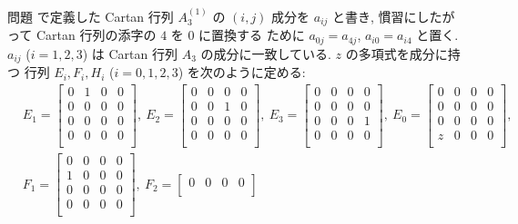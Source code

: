 \documentclass[12pt,twoside]{jarticle}
\begin{document}
\begin{question}
  問題  で定義した
  Cartan 行列 $A_3^{(1)}$ の $(i,j)$ 成分を $a_{ij}$ と書き,
  慣習にしたがって Cartan 行列の添字の $4$ を $0$ に置換する
  ために $a_{0j}=a_{4j}$, $a_{i0}=a_{i4}$ と置く.
  $a_{ij}$ ($i=1,2,3$) は Cartan 行列 $A_3$ の成分に一致している.
  $z$ の多項式を成分に持つ
  行列 $E_i,F_i,H_i$ ($i=0,1,2,3$) を次のように定める:
  {\small
  \begin{align*}
    &
    E_1 = 
    \begin{bmatrix}
      0 & 1 & 0 & 0 \\
      0 & 0 & 0 & 0 \\
      0 & 0 & 0 & 0 \\
      0 & 0 & 0 & 0 \\
    \end{bmatrix},
    \ %
    E_2 = 
    \begin{bmatrix}
      0 & 0 & 0 & 0 \\
      0 & 0 & 1 & 0 \\
      0 & 0 & 0 & 0 \\
      0 & 0 & 0 & 0 \\
    \end{bmatrix},
    \ %
    E_3 = 
    \begin{bmatrix}
      0 & 0 & 0 & 0 \\
      0 & 0 & 0 & 0 \\
      0 & 0 & 0 & 1 \\
      0 & 0 & 0 & 0 \\
    \end{bmatrix},
    \ %
    E_0 = 
    \begin{bmatrix}
      0 & 0 & 0 & 0 \\
      0 & 0 & 0 & 0 \\
      0 & 0 & 0 & 0 \\
      z & 0 & 0 & 0 \\
    \end{bmatrix},
    \\ &
    F_1 = 
    \begin{bmatrix}
      0 & 0 & 0 & 0 \\
      1 & 0 & 0 & 0 \\
      0 & 0 & 0 & 0 \\
      0 & 0 & 0 & 0 \\
    \end{bmatrix},
    \ %
    F_2 = 
    \begin{bmatrix}
      0 & 0 & 0 & 0 \\

\end{bmatrix}
\end{align*}}
\end{question}
\end{document}
